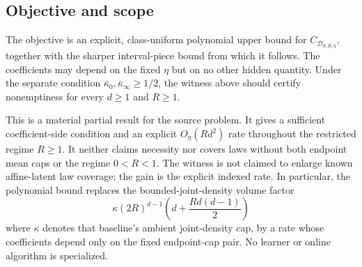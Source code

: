 \subsection{Objective and scope}

The objective is an explicit, class-uniform polynomial upper bound for
$C_{\mathcal D_{d,R,\eta}}$, together with the sharper interval-piece bound
from which it follows.  The coefficients may depend on the fixed $\eta$ but
on no other hidden quantity.  Under the separate condition
$\bar\kappa_0,\bar\kappa_\infty\geq1/2$, the witness above should certify
nonemptiness for every $d\geq1$ and $R\geq1$.

This is a material partial result for the source problem.  It gives a
sufficient coefficient-side condition and an explicit $O_\eta(Rd^2)$ rate
throughout the restricted regime $R\geq1$.  It neither claims necessity nor
covers laws without both endpoint mean caps or the regime $0<R<1$.  The
witness is not claimed to enlarge known affine-latent law coverage; the gain
is the explicit indexed rate.  In particular, the polynomial bound replaces
the bounded-joint-density volume factor
\[
\kappa(2R)^{d-1}\left(d+\frac{Rd(d-1)}2\right)
\]
where $\kappa$ denotes that baseline's ambient joint-density cap, by a rate
whose coefficients depend only on the fixed endpoint-cap pair.
No learner or online algorithm is specialized.
